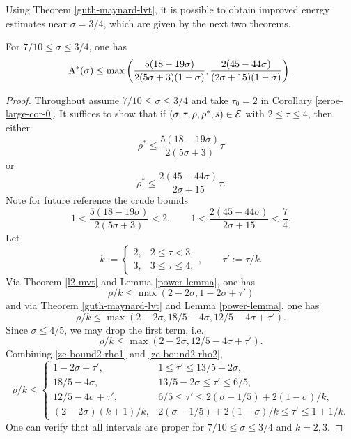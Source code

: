 Using Theorem \ref{guth-maynard-lvt}, it is possible to obtain improved energy estimates near $\sigma = 3/4$, which are given by the next two theorems. 

\begin{theorem}\label{imp-energy-bound2}
For $7/10 \le \sigma \le 3/4$, one has 
\[
\mathrm{A}^*(\sigma) \le \max\left(\frac{5(18 - 19\sigma)}{2(5\sigma + 3)(1 - \sigma)}, \frac{2(45 - 44\sigma)}{(2\sigma + 15)(1 
- \sigma)}\right).
\]
\end{theorem}

\derived 
{}

\begin{proof}

Throughout assume $7/10 \le \sigma \le 3/4$ and take $\tau_0 = 2$ in Corollary \ref{zeroe-large-cor-0}. It suffices to show that if $(\sigma, \tau, \rho, \rho^*, s) \in \mathcal{E}$ with $2 \le \tau \le 4$, then either
\begin{equation}
\rho^* \le \frac{5(18 - 19\sigma)}{2(5\sigma + 3)}\tau
\end{equation}
or 
\begin{equation}
\rho^* \le \frac{2(45 - 44\sigma)}{2\sigma + 15}\tau.
\end{equation}
Note for future reference the crude bounds 
\begin{equation}\label{ze-bound2-tau-factor-bounds}
1 < \frac{5(18 - 19\sigma)}{2(5\sigma + 3)} < 2,\qquad 1 < \frac{2(45 - 44\sigma)}{2\sigma + 15} < \frac{7}{4}.
\end{equation}
Let 
\[
k := \begin{cases}
2,& 2 \le \tau < 3,\\
3,& 3 \le \tau \le 4,
\end{cases},\qquad \tau' := \tau/k.
\]
Via Theorem \ref{l2-mvt} and Lemma \ref{power-lemma}, one has 
\begin{equation}\label{ze-bound2-rho1}
\rho/k \le \max(2 - 2\sigma, 1 - 2\sigma + \tau')
\end{equation}
and via Theorem \ref{guth-maynard-lvt} and Lemma \ref{power-lemma}, one has 
\[
\rho/k\le \max(2 - 2\sigma, 18/5 - 4\sigma, 12/5 - 4\sigma + \tau').
\]
Since $\sigma \le 4/5$, we may drop the first term, i.e. 
\begin{equation}\label{ze-bound2-rho2}
\rho/k \le \max(2 - 2\sigma, 12/5 - 4\sigma + \tau').
\end{equation}
Combining \eqref{ze-bound2-rho1} and \eqref{ze-bound2-rho2},
\begin{equation}\label{ze-bound2-rhok-bound}
\rho/k \le \begin{cases}
1 - 2\sigma + \tau',&1 \le \tau' \le 13/5 - 2\sigma,\\
18/5 - 4\sigma,& 13/5 - 2\sigma \le \tau' \le 6/5,\\
12/5 - 4\sigma + \tau',& 6/5 \le \tau' \le 2(\sigma - 1/5) + 2(1 - \sigma)/k,\\
(2 - 2\sigma)(k + 1)/k,& 2(\sigma - 1/5) + 2(1 - \sigma)/k \le \tau' \le 1 + 1/k.
\end{cases}
\end{equation}
One can verify that all intervals are proper for $7/10 \le \sigma \le 3/4$ and $k = 2,3$. 


\end{proof}
